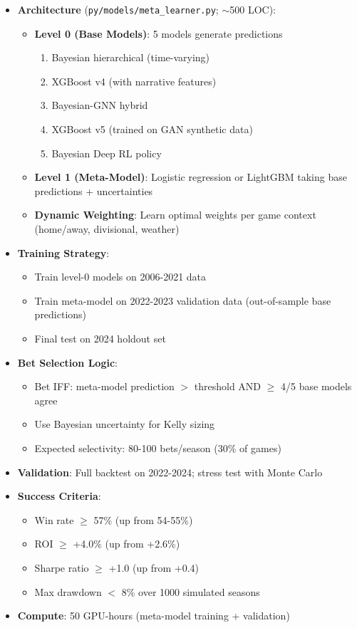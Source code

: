 \begin{itemize}
  \item {} \textbf{Architecture} (\texttt{py/models/meta\_learner.py}; $\sim$500 LOC):
  \begin{itemize}
    \item \textbf{Level 0 (Base Models)}: 5 models generate predictions
    \begin{enumerate}
      \item Bayesian hierarchical (time-varying)
      \item XGBoost v4 (with narrative features)
      \item Bayesian-GNN hybrid
      \item XGBoost v5 (trained on GAN synthetic data)
      \item Bayesian Deep RL policy
    \end{enumerate}
    \item \textbf{Level 1 (Meta-Model)}: Logistic regression or LightGBM taking base predictions + uncertainties
    \item \textbf{Dynamic Weighting}: Learn optimal weights per game context (home/away, divisional, weather)
  \end{itemize}
  \item {} \textbf{Training Strategy}:
  \begin{itemize}
    \item Train level-0 models on 2006-2021 data
    \item Train meta-model on 2022-2023 validation data (out-of-sample base predictions)
    \item Final test on 2024 holdout set
  \end{itemize}
  \item {} \textbf{Bet Selection Logic}:
  \begin{itemize}
    \item Bet IFF: meta-model prediction $>$ threshold AND $\ge$ 4/5 base models agree
    \item Use Bayesian uncertainty for Kelly sizing
    \item Expected selectivity: 80-100 bets/season (30\% of games)
  \end{itemize}
  \item {} \textbf{Validation}: Full backtest on 2022-2024; stress test with Monte Carlo
  \item \textbf{Success Criteria}:
  \begin{itemize}
    \item Win rate $\ge$ 57\% (up from 54-55\%)
    \item ROI $\ge$ +4.0\% (up from +2.6\%)
    \item Sharpe ratio $\ge$ +1.0 (up from +0.4)
    \item Max drawdown $<$ 8\% over 1000 simulated seasons
  \end{itemize}
  \item \textbf{Compute}: 50 GPU-hours (meta-model training + validation)
\end{itemize}

